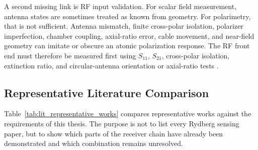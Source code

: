 \documentclass{ieeeaccess}
\begin{document}
A second missing link is RF input validation. For scalar field measurement, antenna states are sometimes treated as known from geometry. For polarimetry, that is not sufficient. Antenna mismatch, finite cross-polar isolation, polarizer imperfection, chamber coupling, axial-ratio error, cable movement, and near-field geometry can imitate or obscure an atomic polarization response. The RF front end must therefore be measured first using \(S_{11}\), \(S_{21}\), cross-polar isolation, extinction ratio, and circular-antenna orientation or axial-ratio tests \cite{Balanis2016}.

\subsection{Representative Literature Comparison}
\label{subsec:lit_representative_comparison}

Table~\ref{tab:lit_representative_works} compares representative works against the requirements of this thesis. The purpose is not to list every Rydberg sensing paper, but to show which parts of the receiver chain have already been demonstrated and which combination remains unresolved.
\end{document}
